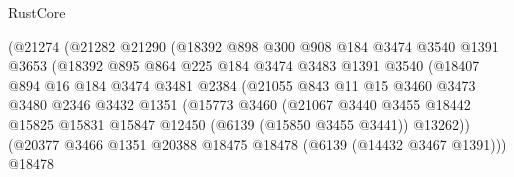 \begin{lexlean}{RustCore}
\begin{coremodule}
                            (@21274
                              (@21282
                                @21290
                                (@18392
                                  @898
                                  @300
                                  @908
                                  @184
                                  @3474
                                  @3540
                                  @1391
                                  @3653
                                  (@18392
                                    @895
                                    @864
                                    @225
                                    @184
                                    @3474
                                    @3483
                                    @1391
                                    @3540
                                    (@18407
                                      @894
                                      @16
                                      @184
                                      @3474
                                      @3481
                                      @2384
                                      (@21055
                                        @843
                                        @11
                                        @15
                                        @3460
                                        @3473
                                        @3480
                                        @2346
                                        @3432
                                        @1351
                                        (@15773
                                          @3460
                                          (@21067
                                            @3440
                                            @3455
                                            @18442
                                            @15825
                                            @15831
                                            @15847
                                            @12450
                                            (@6139 (@15850 @3455 @3441))
                                            @13262))
                                        (@20377
                                          @3466
                                          @1351
                                          @20388
                                          @18475
                                          @18478
                                          (@6139 (@14432 @3467 @1391)))
                                        @18478

\end{coremodule}
\end{lexlean}
